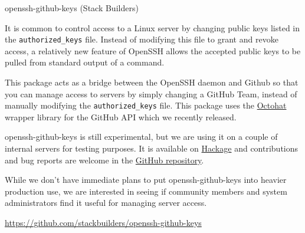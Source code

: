 \documentclass[DIV16,twocolumn,10pt]{scrreprt}
\begin{document}
\begin{hcarentry}{openssh-github-keys (Stack Builders)}
\makeheader

It is common to control access to a Linux server by changing public
keys listed in the \texttt{authorized\_keys} file. Instead of
modifying this file to grant and revoke access, a relatively new
feature of OpenSSH allows the accepted public keys to be pulled from
standard output of a command.

This package acts as a bridge between the OpenSSH daemon and Github so
that you can manage access to servers by simply changing a GitHub
Team, instead of manually modifying the \texttt{authorized\_keys}
file. This package uses the
\href{http://hackage.haskell.org/package/octohat}{Octohat} wrapper
library for the GitHub API which we recently released.

openssh-github-keys is still experimental, but we are using it on a
couple of internal servers for testing purposes. It is available on
\href{http://hackage.haskell.org/package/openssh-github-keys}{Hackage}
and contributions and bug reports are welcome in the
\href{https://github.com/stackbuilders/openssh-github-keys}{GitHub
  repository}.

While we don't have immediate plans to put openssh-github-keys into
heavier production use, we are interested in seeing if community
members and system administrators find it useful for managing server
access.

\FurtherReading
  \url{https://github.com/stackbuilders/openssh-github-keys}
\end{hcarentry}
\end{document}
